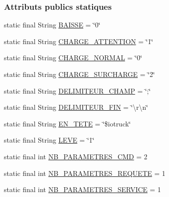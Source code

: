 \subsubsection*{Attributs publics statiques}
\begin{DoxyCompactItemize}
\item 
static final String \hyperlink{classcom_1_1lasalle_1_1io__trucks_1_1_protocole_a30e182f604d3b7c3326f4fe20c36f627}{B\+A\+I\+S\+SE} = \char`\"{}0\char`\"{}
\item 
static final String \hyperlink{classcom_1_1lasalle_1_1io__trucks_1_1_protocole_acd53e8425e6482abe84bcf2659a4c8dc}{C\+H\+A\+R\+G\+E\+\_\+\+A\+T\+T\+E\+N\+T\+I\+ON} = \char`\"{}1\char`\"{}
\item 
static final String \hyperlink{classcom_1_1lasalle_1_1io__trucks_1_1_protocole_aa70a21fae14dba34b24d69b6fdc29332}{C\+H\+A\+R\+G\+E\+\_\+\+N\+O\+R\+M\+AL} = \char`\"{}0\char`\"{}
\item 
static final String \hyperlink{classcom_1_1lasalle_1_1io__trucks_1_1_protocole_a77608f8875eda42ac858d19e534a10ec}{C\+H\+A\+R\+G\+E\+\_\+\+S\+U\+R\+C\+H\+A\+R\+GE} = \char`\"{}2\char`\"{}
\item 
static final String \hyperlink{classcom_1_1lasalle_1_1io__trucks_1_1_protocole_a42598075ccfbcb17730a426048e8bfcf}{D\+E\+L\+I\+M\+I\+T\+E\+U\+R\+\_\+\+C\+H\+A\+MP} = \char`\"{};\char`\"{}
\item 
static final String \hyperlink{classcom_1_1lasalle_1_1io__trucks_1_1_protocole_a9e29c399724eb61c15a11837664369cc}{D\+E\+L\+I\+M\+I\+T\+E\+U\+R\+\_\+\+F\+IN} = \char`\"{}\textbackslash{}r\textbackslash{}n\char`\"{}
\item 
static final String \hyperlink{classcom_1_1lasalle_1_1io__trucks_1_1_protocole_abcbb6acc50e8fad665dcd3024f0b863e}{E\+N\+\_\+\+T\+E\+TE} = \char`\"{}\$iotruck\char`\"{}
\item 
static final String \hyperlink{classcom_1_1lasalle_1_1io__trucks_1_1_protocole_aca580f756cf43aa0010a016f56ff5c5d}{L\+E\+VE} = \char`\"{}1\char`\"{}
\item 
static final int \hyperlink{classcom_1_1lasalle_1_1io__trucks_1_1_protocole_a6d253801bc0eb31ad89b64ec3deab89a}{N\+B\+\_\+\+P\+A\+R\+A\+M\+E\+T\+R\+E\+S\+\_\+\+C\+MD} = 2
\item 
static final int \hyperlink{classcom_1_1lasalle_1_1io__trucks_1_1_protocole_af4d94970871b29d60f0247ea728403bf}{N\+B\+\_\+\+P\+A\+R\+A\+M\+E\+T\+R\+E\+S\+\_\+\+R\+E\+Q\+U\+E\+TE} = 1
\item 
static final int \hyperlink{classcom_1_1lasalle_1_1io__trucks_1_1_protocole_adcca4e56d2f8aaa8e0ef002b90a7c1c1}{N\+B\+\_\+\+P\+A\+R\+A\+M\+E\+T\+R\+E\+S\+\_\+\+S\+E\+R\+V\+I\+CE} = 1

\end{DoxyCompactItemize}
